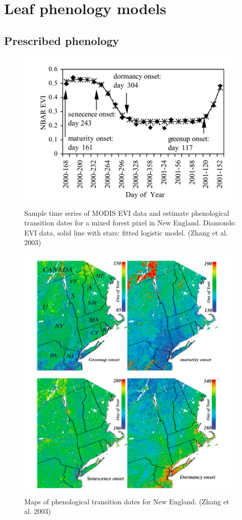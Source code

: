 \documentclass[12pt,oneside]{book}
\begin{document}
\section{Leaf phenology models}\label{leaf-phenology-models}

\subsection{Prescribed phenology}\label{prescribed-phenology}

\begin{figure}

{\centering \includegraphics[width=0.8\linewidth]{figures/chap4/f44_zhang} 

}

\caption{Sample time series of MODIS EVI data and estimate phenological transition dates for a mixed forest pixel in New England. Diamonds: EVI data, solid line with stars: fitted logistic model. (Zhang et al. 2003)}\label{fig:f44}
\end{figure}

\begin{figure}

{\centering \includegraphics[width=0.8\linewidth]{figures/chap4/f45_zhang_map} 

}

\caption{Maps of phenological transition dates for New England. (Zhang et al. 2003)}\label{fig:f45}
\end{figure}
\end{document}
